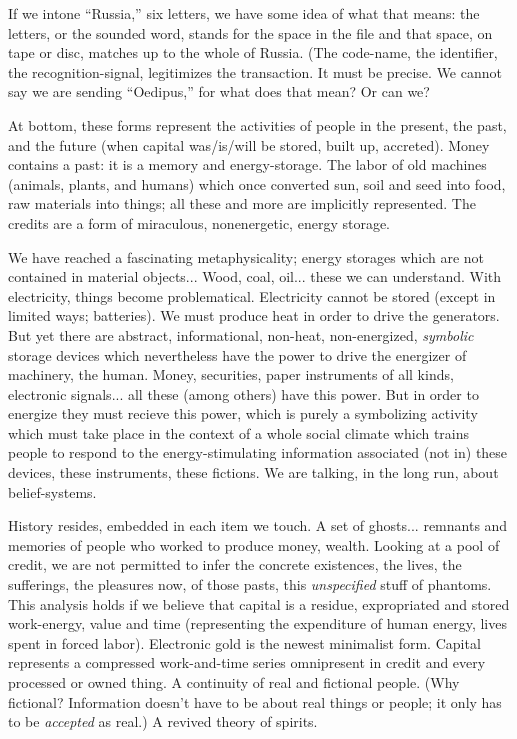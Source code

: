 If we intone \enquote{Russia,} six letters, we have
some idea of what that means: the letters, or
the sounded word, stands for the space in the
file and that space, on tape or disc, matches
up to the whole of Russia. (The code-name,
the identifier, the recognition-signal, legitimizes the transaction. It must be precise. We
cannot say we are sending \enquote{Oedipus,} for
what does that mean? Or can we?

At bottom, these forms represent the activities of people in the present, the past, and
the future (when capital was/is/will be
stored, built up, accreted). Money contains a
past: it is a memory and energy-storage. The
labor of old machines (animals, plants, and
humans) which once converted sun, soil and
seed into food, raw materials into things; all
these and more are implicitly represented.
The credits are a form of miraculous, nonenergetic, energy storage.

We have reached a fascinating metaphysicality; energy storages which are not contained in material objects... Wood, coal, oil... these we can understand. With electricity, things become problematical. Electricity
cannot be stored (except in limited ways;
batteries). We must produce heat in order to
drive the generators. But yet there are abstract,
informational, non-heat, non-energized, \emph{symbolic} storage devices which nevertheless
have the power to drive the energizer of machinery,
the human. Money, securities, paper instruments of all kinds,
electronic signals... all these (among others) have this power.
But in order to energize they must recieve this power, which is purely a symbolizing activity which must take place in the context of a whole social climate which trains people to respond to the energy-stimulating information associated (not in) these devices, these instruments, these fictions. We are talking, in the long run, about belief-systems.

History resides, embedded in each item we touch. A set of ghosts... remnants and memories of people who worked to produce money, wealth. Looking at a pool of credit, we are not permitted to infer the concrete existences, the lives, the sufferings, the pleasures now, of those pasts, this \emph{unspecified} stuff of phantoms. This analysis holds if we believe that capital is a residue, expropriated and stored work-energy, value and time (representing the expenditure of human energy, lives spent in forced labor). Electronic gold is the newest minimalist form. Capital represents a compressed work-and-time series omnipresent in credit and every processed or owned thing. A continuity of real and fictional people. (Why fictional? Information doesn't have to be about real things or people; it only has to be \emph{accepted} as real.) A revived theory of spirits.

